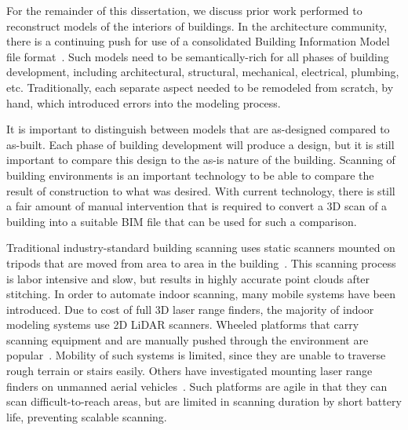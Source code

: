 \documentclass[12pt,onecolumn,oneside]{book}
\begin{document}
For the remainder of this dissertation, we discuss prior work performed to reconstruct models of the interiors of buildings.  In the architecture community, there is a continuing push for use of a consolidated Building Information Model file format~\cite{AutodeskBIM}.  Such models need to be semantically-rich for all phases of building development, including architectural, structural, mechanical, electrical, plumbing, etc.  Traditionally, each separate aspect needed to be remodeled from scratch, by hand, which introduced errors into the modeling process.

It is important to distinguish between models that are as-designed compared to as-built.  Each phase of building development will produce a design, but it is still important to compare this design to the as-is nature of the building.  Scanning of building environments is an important technology to be able to compare the result of construction to what was desired.  With current technology, there is still a fair amount of manual intervention that is required to convert a 3D scan of a building into a suitable BIM file that can be used for such a comparison.

Traditional industry-standard building scanning uses static scanners mounted on tripods that are moved from area to area in the building~\cite{RoomSegmentation,HistWallRecon,BasicPlaneFit}. This scanning process is labor intensive and slow, but results in highly accurate point clouds after stitching.  In order to automate indoor scanning, many mobile systems have been introduced. Due to cost of full 3D laser range finders, the majority of indoor modeling systems use 2D LiDAR scanners.  Wheeled platforms that carry scanning equipment and are manually pushed through the environment are popular~\cite{Carving, ProbabilisticRobotics}.  Mobility of such systems is limited, since they are unable to traverse rough terrain or stairs easily.  Others have investigated mounting laser range finders on unmanned aerial vehicles~\cite{Quadrotor,QuadrotorMIT,SpectralClustering}.  Such platforms are agile in that they can scan difficult-to-reach areas, but are limited in scanning duration by short battery life, preventing scalable scanning.
\end{document}
